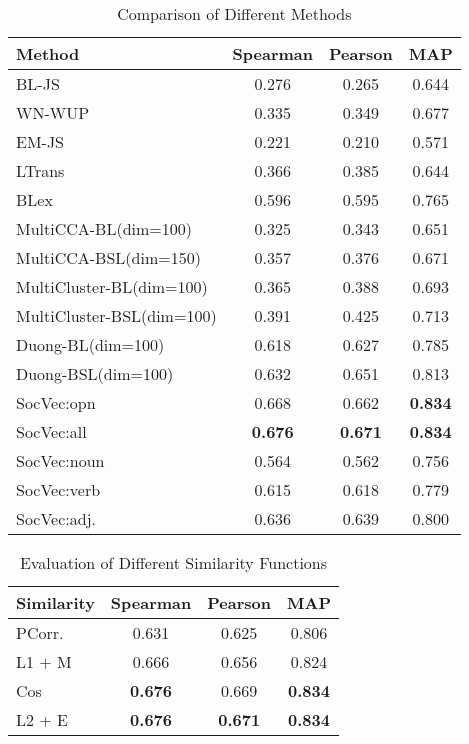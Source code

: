 \begin{table}[th]
	\small
	\centering
	\caption{{Comparison of Different Methods}}
	\begin{tabular}{|l|c|c|c|}
		\hline
		\textbf{Method} & \textbf{Spearman} & \textbf{Pearson}  & \textbf{MAP} \\ \hline\hline
		BL-JS& 0.276 & 0.265 & 0.644   \\ 
		WN-WUP  & 0.335 & 0.349 & 0.677 \\ 
		EM-JS & 0.221 & 0.210  & 0.571\\ 
		LTrans& 0.366 & 0.385  & 0.644  \\
		BLex& 0.596 & 0.595  & 0.765 \\ \hline 
MultiCCA-BL(dim=100)&0.325&0.343&0.651\\  
MultiCCA-BSL(dim=150)&0.357&0.376&0.671\\ 
MultiCluster-BL(dim=100)&0.365&0.388&0.693\\ 
MultiCluster-BSL(dim=100)&0.391&0.425&0.713\\ 
Duong-BL(dim=100)&0.618&0.627&0.785\\ 
Duong-BSL(dim=100)&0.632&0.651&0.813\\ \hline 
		SocVec:opn& 0.668 & 0.662   & \textbf{0.834} \\ 
		SocVec:all& \textbf{0.676} & \textbf{0.671}  & \textbf{0.834}\\ 
		SocVec:noun & 0.564 & 0.562 & 0.756 \\ 
		SocVec:verb & 0.615 & 0.618 & 0.779 \\ 
		SocVec:adj. & 0.636 & 0.639 & 0.800 \\ \hline
	\end{tabular}
	\label{tab:mcdne_res_1}
\end{table}
\begin{table}[th]
	\centering
	\small
	\caption{{Evaluation of Different Similarity Functions}}
	\label{tab:mcdne_res_2}
	\begin{tabular}{|l|c|c|c|}
		\hline
		\textbf{Similarity} & \textbf{Spearman} & \textbf{Pearson}   & \textbf{MAP} \\ \hline\hline
		PCorr. & 0.631 & 0.625 & 0.806\\ 
		L1 + M & 0.666 & 0.656 & 0.824 \\  
		Cos & \textbf{0.676} & 0.669 & \textbf{0.834} \\ 
		L2 + E & \textbf{0.676} & \textbf{0.671} & \textbf{0.834} \\ \hline
	\end{tabular}
\end{table}

